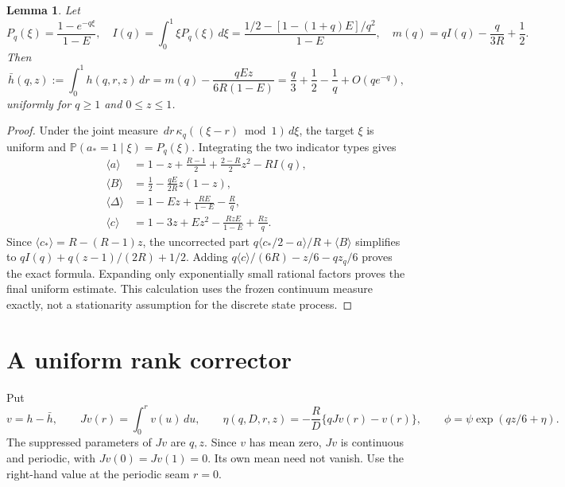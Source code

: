 \documentclass[11pt,letterpaper]{article}
\newtheorem{lemma}[theorem]{Lemma}
\theoremstyle{remark}
\newcommand{\Pp}{\mathbb P}
\newcommand{\dd}{\,d}
\begin{document}
\begin{lemma}\label{a58:ln:lem:mean}
Let
\begin{equation}\label{a58:ln:eq:meanfunctions}
 P_q(\xi)=\frac{1-e^{-q\xi}}{1-E},\quad
 I(q)=\int_0^1\xi P_q(\xi)\dd\xi
 =\frac{1/2-[1-(1+q)E]/q^2}{1-E},\quad
 m(q)=qI(q)-\frac q{3R}+\frac12.
\end{equation}
Then
\begin{equation}\label{a58:ln:eq:mean}
 \bar h(q,z):=\int_0^1h(q,r,z)\dd r
 =m(q)-\frac{qEz}{6R(1-E)}
 =\frac q3+\frac12-\frac1q+O(qe^{-q}),
\end{equation}
uniformly for $q\ge1$ and $0\le z\le1$.
\end{lemma}
\begin{proof}
Under the joint measure $\dd r\,\kappa_q((\xi-r)\bmod1)\dd\xi$,
the target $\xi$ is uniform and
$\Pp(a_*=1\mid\xi)=P_q(\xi)$. Integrating the two indicator types gives
\begin{align*}
 \langle a\rangle&=1-z+\frac{R-1}{2}
                 +\frac{2-R}{2}z^2-RI(q),\\
 \langle B\rangle&=\frac12-\frac{qE}{2R}z(1-z),\\
 \langle\Delta\rangle&=1-Ez+\frac{RE}{1-E}-\frac Rq,\\
 \langle c\rangle&=1-3z+Ez^2-\frac{RzE}{1-E}+\frac{Rz}q.
\end{align*}
Since $\langle c_*\rangle=R-(R-1)z$, the uncorrected part
$q\langle c_*/2-a\rangle/R+\langle B\rangle$ simplifies to
$qI(q)+q(z-1)/(2R)+1/2$.
Adding $q\langle c\rangle/(6R)-z/6-qz_q/6$ proves the exact formula.
Expanding only exponentially small rational factors proves the final
uniform estimate. This calculation uses the frozen continuum measure
exactly, not a stationarity assumption for the discrete state process.
\end{proof}

\section{A uniform rank corrector}\label{a58:ln:sec:corrector}
Put
\begin{equation}\label{a58:ln:eq:correctordef}
 v=h-\bar h,\qquad Jv(r)=\int_0^r v(u)\dd u,\qquad
 \eta(q,D,r,z)=-\frac RD\{qJv(r)-v(r)\},\qquad
 \phi=\psi\exp(qz/6+\eta).
\end{equation}
The suppressed parameters of $Jv$ are $q,z$. Since $v$ has mean zero,
$Jv$ is continuous and periodic, with $Jv(0)=Jv(1)=0$. Its own mean
need not vanish. Use the right-hand value at the periodic seam $r=0$.
\end{document}
